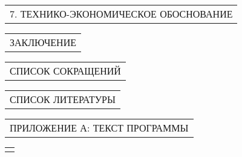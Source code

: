 \documentclass[12pt, А4, twoside]{article}
\begin{document}
\begin{FlushLeft}
    \vspace{-0.1 cm}

    \begin{tabular}{p{17.25cm}} 
        \hspace{0.3cm} \textsf{7. ТЕХНИКО-ЭКОНОМИЧЕСКОЕ ОБОСНОВАНИЕ} \vspace{1pt} \hline \\
    \end{tabular}  

    \vspace{-0.1 cm}

    \begin{tabular}{p{17.25cm}}
        \hspace{0.3cm} \textsf{ЗАКЛЮЧЕНИЕ} \vspace{1pt} \hline \\
    \end{tabular}

    \vspace{-0.1 cm}

    \begin{tabular}{p{17.25cm}}
        \hspace{0.3cm} \textsf{СПИСОК СОКРАЩЕНИЙ} \vspace{0pt} \hline \\
    \end{tabular}

    \vspace{-0.1 cm}

    \begin{tabular}{p{17.25cm}}
        \hspace{0.3cm} \textsf{СПИСОК ЛИТЕРАТУРЫ} \vspace{1pt} \hline  \\
    \end{tabular}

    \vspace{-0.1 cm}

    \begin{tabular}{p{17.25cm}}
        \hspace{0.3cm} \textsf{ПРИЛОЖЕНИЕ А: ТЕКСТ ПРОГРАММЫ} \vspace{1pt} \hline  \\
    \end{tabular}

    \begin{tabular}{p{17.25cm}}
        \vspace{0pt} \hline \\
    \end{tabular}


\end{FlushLeft}
\end{document}
